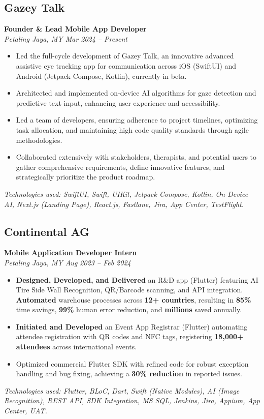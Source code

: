 \documentclass[10pt,letterpaper]{article} %
\newcommand{\jobDetailsLine}[1]{\noindent\textit{#1}\par\vspace{0.5ex}}
\begin{document}
\subsection*{Gazey Talk}
\noindent\textbf{Founder \& Lead Mobile App Developer} \\
\jobDetailsLine{Petaling Jaya, MY \textbullet{} Mar 2024 – Present}
\begin{itemize}
    \item Led the full-cycle development of Gazey Talk, an innovative advanced assistive eye tracking app for communication across iOS (SwiftUI) and Android (Jetpack Compose, Kotlin), currently in beta.
    \item Architected and implemented on-device AI algorithms for gaze detection and predictive text input, enhancing user experience and accessibility.
    \item Led a team of developers, ensuring adherence to project timelines, optimizing task allocation, and maintaining high code quality standards through agile methodologies.
    \item Collaborated extensively with stakeholders, therapists, and potential users to gather comprehensive requirements, define innovative features, and strategically prioritize the product roadmap.
\end{itemize}
\textit{Technologies used: SwiftUI, Swift, UIKit, Jetpack Compose, Kotlin, On-Device AI, Next.js (Landing Page), React.js, Fastlane, Jira, App Center, TestFlight.}
\vspace{1ex}

\subsection*{Continental AG}
\noindent\textbf{Mobile Application Developer Intern} \\
\jobDetailsLine{Petaling Jaya, MY \textbullet{} Aug 2023 – Feb 2024}
\begin{itemize}
    \item \textbf{Designed, Developed, and Delivered} an R\&D app (Flutter) featuring AI Tire Side Wall Recognition, QR/Barcode scanning, and API integration. \textbf{Automated} warehouse processes across \textbf{12+ countries}, resulting in \textbf{85\%} time savings, \textbf{99\%} human error reduction, and \textbf{millions} saved annually.
    \item \textbf{Initiated and Developed} an Event App Registrar (Flutter) automating attendee registration with QR codes and NFC tags, registering \textbf{18,000+ attendees} across international events.
    \item Optimized commercial Flutter SDK with refined code for robust exception handling and bug fixing, achieving a \textbf{30\% reduction} in reported issues.
\end{itemize}
\textit{Technologies used: Flutter, BLoC, Dart, Swift (Native Modules), AI (Image Recognition), REST API, SDK Integration, MS SQL, Jenkins, Jira, Appium, App Center, UAT.}
\vspace{1ex}
\end{document}
